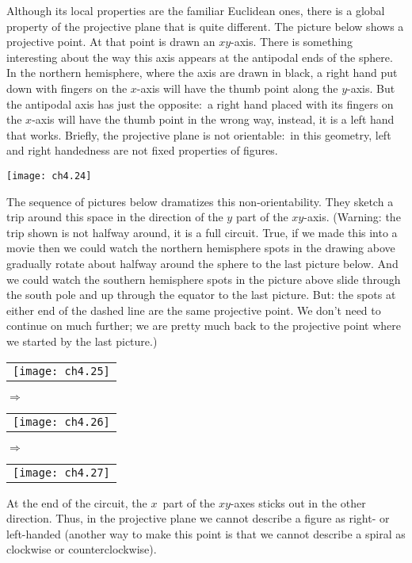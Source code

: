 Although its local properties are the familiar Euclidean ones,
there is a global property of the projective plane that is
quite different.
The picture below shows a projective point.
At that point is drawn an $xy$-axis.
There is something interesting about the way this axis appears at the 
antipodal ends of the sphere.
In the northern hemisphere, where the axis are drawn in black, a
right hand put down with fingers on the $x$-axis 
will have the thumb point along the $y$-axis.
But the antipodal axis has just the opposite:~a 
right hand placed with its fingers on the $x$-axis will have 
the thumb point in the wrong way, instead, it is a left hand 
that works.
Briefly, the projective plane is not orientable:~in this geometry,
left and right handedness are not fixed properties of figures.
\begin{center}
  \texttt{[image: ch4.24]}
\end{center}
The sequence of pictures below dramatizes this non-orientability.
They sketch a trip around this space in the direction of the
$y$ part of the $xy$-axis.
(Warning: the trip shown is not halfway around, it is a full circuit.
True, if we made this into a movie then we could watch 
the northern hemisphere spots in 
the drawing above gradually rotate about halfway around the sphere to 
the last picture below.
And we could watch the southern hemisphere spots in the picture above slide 
through the south pole and up through the equator to
the last picture.
But: the spots at either end of the dashed line are the same 
projective point.
We don't need to continue on much further;
we are pretty much back to the projective point where we started
by the last picture.) 
\begin{center}
  \begin{tabular}{@{}c@{}}\texttt{[image: ch4.25]}\end{tabular}
\qquad\mbox{$\Longrightarrow$}\qquad
  \begin{tabular}{@{}c@{}}\texttt{[image: ch4.26]}\end{tabular}
\qquad\mbox{$\Longrightarrow$}\qquad
  \begin{tabular}{@{}c@{}}\texttt{[image: ch4.27]}\end{tabular}
\end{center}
At the end of the circuit, 
the $x$~part of the $xy$-axes sticks out in the other direction.
Thus, 
in the projective plane we cannot describe a figure as right-{} or left-handed
(another way to make this point 
is that we cannot describe a spiral as clockwise or
counterclockwise).


